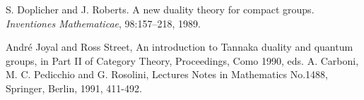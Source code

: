 \documentclass[12pt]{article}
\theoremstyle{plain}
\theoremstyle{definition}
\numberwithin{equation}{section}
\begin{document}
\begin{thebibliography}{99}
S. Doplicher and J. Roberts. A new duality theory for compact groups. 
{\em Inventiones Mathematicae}, 98:157--218, 1989.

Andr\'e Joyal and Ross Street, An introduction to Tannaka duality and quantum groups, in Part II of Category Theory, Proceedings, Como 1990, eds. A. Carboni, M. C. Pedicchio and G. Rosolini, Lectures Notes in Mathematics No.1488, Springer, Berlin, 1991, 411-492. 

\end{thebibliography}
\end{document}
